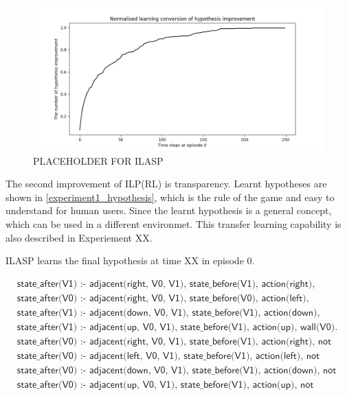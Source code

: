 \begin{figure}[!htb]
\centering
\includegraphics[width=1.0\textwidth]{./figures/experiment1_ilasp}
\caption{PLACEHOLDER FOR ILASP}
\label{experiment1_test}
\end{figure}

The second improvement of ILP(RL) is transparency. 
Learnt hypotheses are shown in \ref{experiment1_hypothesis}, 
which is the rule of the game and easy to understand for human users. Since the learnt hypothesis is a general concept, which can be used in a different environmet. 
This transfer learning capability is also described in Experiement XX. 

ILASP learns the final hypothesis at time XX in episode 0.

\begin{equation}
\begin{split}
&\textsf{state\_after(V1) :- adjacent(right, V0, V1), state\_before(V1), action(right), wall(V0).}\\
&\textsf{state\_after(V0) :- adjacent(right, V0, V1), state\_before(V0), action(left), wall(V1).}\\
&\textsf{state\_after(V1) :- adjacent(down, V0, V1), state\_before(V1), action(down), wall(V0).}\\
&\textsf{state\_after(V1) :- adjacent(up, V0, V1), state\_before(V1), action(up), wall(V0).}\\
&\textsf{state\_after(V0) :- adjacent(right, V0, V1), state\_before(V1), action(right), not wall(V0).}\\
&\textsf{state\_after(V0) :- adjacent(left, V0, V1), state\_before(V1), action(left), not wall(V0).}\\
&\textsf{state\_after(V0) :- adjacent(down, V0, V1), state\_before(V1), action(down), not wall(V0).}\\
&\textsf{state\_after(V0) :- adjacent(up, V0, V1), state\_before(V1), action(up), not wall(V0).}
\end{split}
\end{equation}
\label{experiment1_hypothesis}

